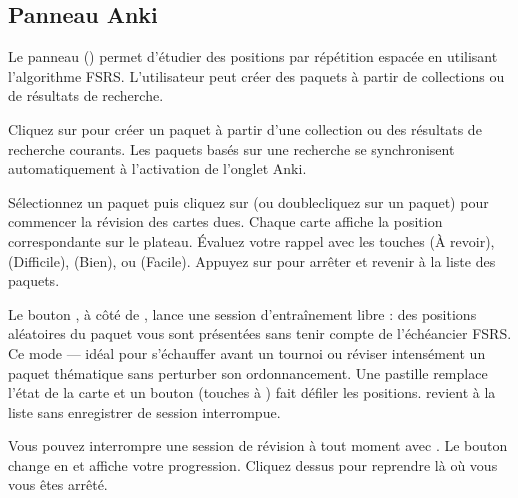 \documentclass[letterpaper,10pt,french]{sphinxmanual}
\begin{document}
\subsection{Panneau Anki}
\label{\detokenize{manuel:panneau-anki}}\label{\detokenize{manuel:id10}}
\sphinxAtStartPar
Le panneau  () permet d’étudier des positions par répétition
espacée en utilisant l’algorithme FSRS. L’utilisateur peut créer des paquets
à partir de collections ou de résultats de recherche.

\sphinxAtStartPar
{} Cliquez sur  pour créer un paquet à partir
d’une collection ou des résultats de recherche courants. Les paquets basés sur
une recherche se synchronisent automatiquement à l’activation de l’onglet Anki.

\sphinxAtStartPar
{} Sélectionnez un paquet puis cliquez sur  (ou double\sphinxhyphen{}cliquez
sur un paquet) pour commencer la révision des cartes dues. Chaque carte affiche
la position correspondante sur le plateau. Évaluez votre rappel avec les touches
 (À revoir),  (Difficile),  (Bien), ou  (Facile). Appuyez sur 
pour arrêter et revenir à la liste des paquets.

\sphinxAtStartPar
{} Le bouton , à côté de , lance une
session d’entraînement libre : des positions aléatoires du paquet vous sont
présentées sans tenir compte de l’échéancier FSRS. Ce mode  — idéal pour s’échauffer avant un tournoi ou
réviser intensément un paquet thématique sans perturber son ordonnancement. Une
pastille  remplace l’état de la carte et un bouton  (touches 
à ) fait défiler les positions.  revient à la liste sans enregistrer de
session interrompue.

\sphinxAtStartPar
{} Vous pouvez interrompre une session de révision à tout moment
avec . Le bouton change en  et affiche votre progression.
Cliquez dessus pour reprendre là où vous vous êtes arrêté.
\end{document}
